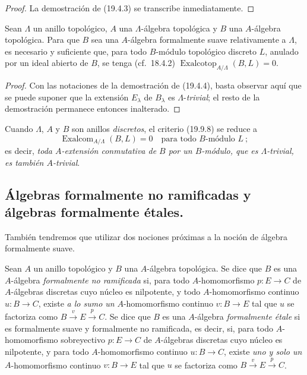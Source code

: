 \begin{proof}
La demostración de (19.4.3) se transcribe inmediatamente.
\end{proof}

\begin{proposition}[19.9.8]
\label{0.19.9.8-fr}
Sean $\Lambda$ un anillo topológico, $A$ una $\Lambda$-álgebra topológica y
$B$ una $A$-álgebra topológica. Para que $B$ sea una $A$-álgebra formalmente
suave relativamente a $\Lambda$, es necesario y suficiente que, para todo
$B$-módulo topológico discreto $L$, anulado por un ideal abierto de $B$, se
tenga \textup{(cf.~18.4.2)}
$\operatorname{Exalcotop}_{A/\Lambda}(B,L)=0$.
\end{proposition}

\begin{proof}
Con las notaciones de la demostración de (19.4.4), basta observar aquí que se
puede suponer que la extensión $E_\lambda$ de $B_\lambda$ es
$\Lambda$-\emph{trivial}; el resto de la demostración permanece entonces inalterado.
\end{proof}

Cuando $\Lambda$, $A$ y $B$ son anillos \emph{discretos}, el criterio (19.9.8) se
reduce a
\begin{equation}
\tag{19.9.8.1}
\label{0.19.9.8.1-fr}
  \operatorname{Exalcom}_{A/\Lambda}(B,L)=0
  \quad\text{para todo $B$-módulo $L$}~;
\end{equation}
es decir, \emph{toda $A$-extensión conmutativa de $B$ por un $B$-módulo, que es
$\Lambda$-trivial, es también $A$-trivial}.

\subsection{Álgebras formalmente no ramificadas y álgebras formalmente
étales.}
\label{subsection:0.19.10-fr}
\label{0.19.10-fr}

\begin{env}[19.10.1]
\label{0.19.10.1-fr}
También tendremos que utilizar dos nociones próximas a la noción de álgebra
formalmente suave.
\end{env}

\begin{definition}[19.10.2]
\label{0.19.10.2-fr}
Sean $A$ un anillo topológico y $B$ una $A$-álgebra topológica. Se dice que
$B$ es una $A$-álgebra \emph{formalmente no ramificada} si, para todo
$A$-homomorfismo $p:E\to C$ de $A$-álgebras discretas cuyo núcleo es
nilpotente, y todo $A$-homomorfismo continuo $u:B\to C$, existe \emph{a lo sumo
un} $A$-homomorfismo continuo $v:B\to E$ tal que $u$ se factoriza como
$B\xrightarrow{v}E\xrightarrow{p}C$. Se dice que $B$ es una $A$-álgebra
\emph{formalmente étale} si es formalmente suave y formalmente no ramificada, es
decir, si, para todo $A$-homomorfismo sobreyectivo $p:E\to C$ de $A$-álgebras
discretas cuyo núcleo es nilpotente, y para todo $A$-homomorfismo continuo
$u:B\to C$, existe \emph{uno y solo un} $A$-homomorfismo continuo $v:B\to E$
tal que $u$ se factoriza como $B\xrightarrow{v}E\xrightarrow{p}C$.
\end{definition}

